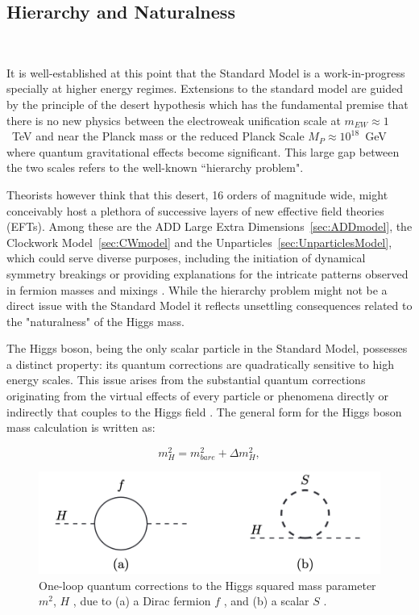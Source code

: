 \subsection{Hierarchy and Naturalness}~\label{sec:HierarchyandNaturalness}

It is well-established at this point that the Standard Model is a work-in-progress specially at higher energy regimes. Extensions to the standard model are guided by the principle of the desert hypothesis which has the fundamental premise that there is no new physics between the electroweak unification scale at $m_{EW}\approx1$~TeV and near the Planck mass or the reduced Planck Scale $M_P\approx 10^{18}$~GeV where quantum gravitational effects become significant. This large gap between the two scales refers to the well-known ``hierarchy problem". 

Theorists however think that this desert, 16 orders of magnitude wide, might conceivably host a plethora of successive layers of new effective field theories (EFTs). Among these are the ADD Large Extra Dimensions~\ref{sec:ADDmodel}, the Clockwork Model~\ref{sec:CWmodel} and the Unparticles~\ref{sec:UnparticlesModel}, which could serve diverse purposes, including the initiation of dynamical symmetry breakings or providing explanations for the intricate patterns observed in fermion masses and mixings \cite{Arkani-Hamed:1998jmv}. While the hierarchy problem might not be a direct issue with the Standard Model it reflects unsettling consequences related to the "naturalness" of the Higgs mass. 

The Higgs boson, being the only scalar particle in the Standard Model, possesses a distinct property: its quantum corrections are quadratically sensitive to high energy scales. This issue arises from the substantial quantum corrections originating from the virtual effects of every particle or phenomena directly or indirectly that couples to the Higgs field \cite{Martin:1997ns}. The general form for the Higgs boson mass calculation is written as:

\begin{equation}
    \label{eq:HiggsMass}
    m^2_H = m^2_{bare} + \Delta m^2_{H}, 
\end{equation}

\begin{figure}[!htbp]
	\centering  
    \includegraphics[scale=1.0]{fig/LoopCorrHiggs.png}
	\caption{One-loop quantum corrections to the Higgs squared mass parameter $m^2$, $H$ , due to (a) a Dirac fermion $f$ , and (b) a scalar $S$ \cite{Martin:1997ns}. }
	  \label{fig:HiggsQuantumCorr}
\end{figure}

